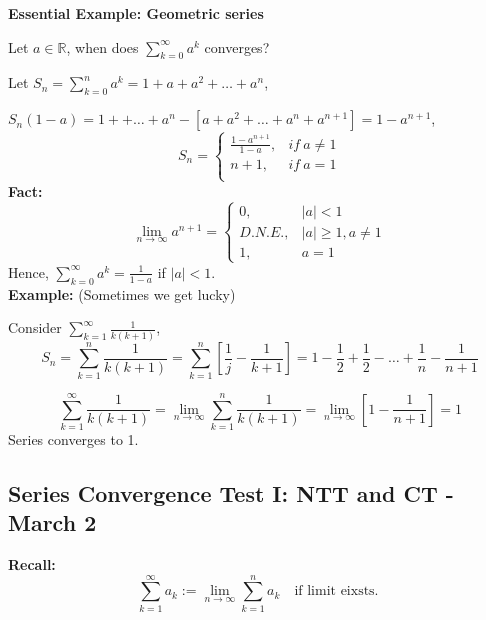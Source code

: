 \documentclass[12pt]{article}
\theoremstyle{plain}
\newcommand{\abs}[1]{\left| #1 \right|}
\newcommand{\mR}{{\mathbb{R}}}
\begin{document}
{\color{Brown}
\textbf{Essential Example: Geometric series}

Let $a \in \mR$, when does $\sum_{k=0}^{\infty} a^k$ converges? 

Let $S_n = \sum_{k=0}^n a^k = 1 + a + a^2 + \ldots + a^n$, 

$S_n(1-a) = 1+ + \ldots + a^n - [a+a^2 + \ldots + a^n + a^{n+1}] 
= 1-a^{n+1}$, 
\[
	S_n = 
	\begin{cases}
		\frac{1-a^{n+1}}{1-a}, & if \ a\neq 1\\
		n+1, & if \ a = 1\\
	\end{cases}
\]
\textbf{Fact:} 
\[
	\lim_{n\to\infty} a^{n+1} 
	= 
	\begin{cases}
	0, & \abs{a}<1\\
	D.N.E., & \abs{a} \geq 1, a \neq 1\\
	1, & a = 1
	\end{cases}
\]
Hence, $\sum_{k=0}^{\infty} a^k = \frac1{1-a}$ if $\abs a < 1$. \\

\textbf{Example: } (Sometimes we get lucky)

Consider $\sum_{k=1}^{\infty} \frac1{k(k+1)}$, 
\[
	S_n = \sum_{k=1}^n \frac1{k(k+1)} = \sum_{k=1}^n [\frac 1j - \frac1{k+1}]
	= 1 - \frac 12 + \frac 12 - \ldots + \frac 1n - \frac1{n+1}
\]

\[
	\sum_{k=1}^{\infty} \frac1{k(k+1)} 
	=\lim_{n\to\infty} \sum_{k=1}^n \frac1{k(k+1)} 
	= \lim_{n\to\infty} [1-\frac1{n+1}] = 1
\]
Series converges to 1. 

}




\newpage
\subsection{Series Convergence Test I: NTT and CT - March 2}

\textbf{Recall: }
\[
	\sum_{k=1}^{\infty} a_k := \lim_{n\to\infty} \sum_{k=1}^n a_k
	\quad \text{if limit eixsts. }
\]
\end{document}
